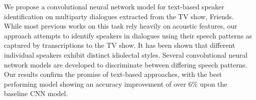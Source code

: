 We propose a convolutional neural network model for text-based speaker identification on multiparty dialogues extracted from the TV show, Friends. While most previous works on this task rely heavily on acoustic features, our approach attempts to identify speakers in dialogues using their speech patterns as captured by transcriptions to the TV show. It has been shown that different individual speakers exhibit distinct idiolectal styles. Several convolutional neural network models are developed to discriminate between differing speech patterns. Our results confirm the promise of text-based approaches, with the best performing model showing an accuracy improvement of over 6\% upon the baseline CNN model.
